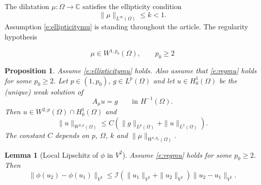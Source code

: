 \documentclass[10pt,a4paper]{amsart}
\newtheorem{proposition}{Proposition}
\newtheorem{lemma}{Lemma}
\begin{document}
The dilatation $\mu:\Omega \to \mathbb C$ satisfies the ellipticity condition \begin{equation} \label{e:ellipticitymu}
	\|\mu\|_{L^\infty(\Omega)} \le k < 1.
\end{equation}Assumption \eqref{e:ellipticitymu} is standing throughout the article. The regularity hypothesis

 \begin{equation} \label{e:regmu}
\mu \in W^{1,p_0}(\Omega), \qquad p_0\geq 2
\end{equation}

\begin{proposition} \label{prop:W2p-A}
Assume \eqref{e:ellipticitymu} holds. Also assume that \eqref{e:regmu} holds for some $p_0\geq 2.$ 
Let $p \in (1,p_0)$, $g\in L^{p}(\Omega)$ and let $u\in H^{1}_{0}(\Omega)$ be the (unique) weak solution of
\[
A_\mu u = g \qquad\text{in }H^{-1}(\Omega).
\]
Then $u\in W^{2,p}(\Omega)\cap H^{1}_{0}(\Omega)$ and
\begin{equation}\label{eq:W2p-est-A}
\|u\|_{W^{2,p}(\Omega)}
\le C\left(\|g\|_{L^{p}(\Omega)}+\|u\|_{L^{2}(\Omega)}\right).
\end{equation}
The constant $C$ depends on $p$, $\Omega$, $k$ and $\|\mu\|_{W^{1,p_0}(\Omega)}$. 
\end{proposition}

\begin{lemma}[Local Lipschitz of $\phi$ in ${V^2}$]\label{lem:phi-lip-H2}
Assume   \eqref{e:regmu} holds for some $p_0 \geq 2$. Then 
\begin{equation}\label{eq:phi-lip-H2}
\|\phi(u_2)-\phi(u_1)\|_{{V^2}}\le \mathcal I(\|u_1\|_{{V^2}}+ \|u_2\|_{{V^2}}) \|u_2-u_1\|_{{V^2}}.
\end{equation}
\end{lemma}
\end{document}
